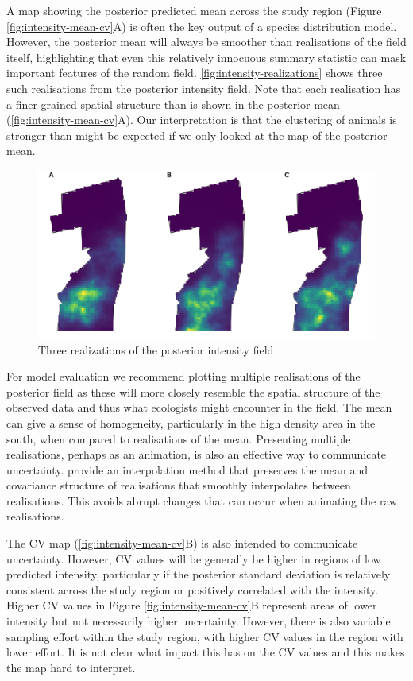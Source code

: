 \documentclass{stylefile16/statsoc}
\begin{document}
A map showing the posterior predicted mean across the study region (Figure \ref{fig:intensity-mean-cv}A) is often the key output of a species distribution model.  However, the posterior mean will always be smoother than realisations of the field itself, highlighting that even this relatively innocuous summary statistic can mask important features of the random field.  \autoref{fig:intensity-realizations} shows three such realisations from the posterior intensity field.  Note that each realisation has a finer-grained spatial structure than is shown in the posterior mean (\autoref{fig:intensity-mean-cv}A).  Our interpretation is that the clustering of animals is stronger than might be expected if we only looked at the map of the posterior mean.
\begin{figure}[!htb]
	\includegraphics[scale=0.525]{figures/intensity_realized.png}
	\caption{Three realizations of the posterior intensity field}
	\label{fig:intensity-realizations}
\end{figure}

For model evaluation we recommend plotting multiple realisations of the posterior field as these will more closely resemble the spatial structure of the observed data and thus what ecologists might encounter in the field.  The mean can give a sense of homogeneity, particularly in the high density area in the south, when compared to realisations of the mean.  Presenting multiple realisations, perhaps as an animation, is also an effective way to communicate uncertainty. \cite{bowman_GraphicsUncertainty_2019a} provide an interpolation method that preserves the mean and covariance structure of realisations that smoothly interpolates between realisations.  This avoids abrupt changes that can occur when animating the raw realisations.  

The CV map (\autoref{fig:intensity-mean-cv}B) is also intended to communicate uncertainty.  However, CV values will be generally be higher in regions of low predicted intensity, particularly if the posterior standard deviation is relatively consistent across the study region or positively correlated with the intensity.  Higher CV values in Figure \ref{fig:intensity-mean-cv}B represent areas of lower intensity but not necessarily higher uncertainty.  However, there is also variable sampling effort within the study region, with higher CV values in the region with lower effort.  It is not clear what impact this has on the CV values and this makes the map hard to interpret.
\end{document}
